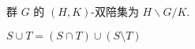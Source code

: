 \documentclass[nofonts]{ctexart}
\begin{document}
群 $G$ 的 $(H,K)$-双陪集为 $H\backslash G/K$.

$S \cup T = (S \cap T) \cup (S\setminus T)$
\end{document}
